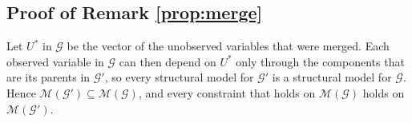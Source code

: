 \documentclass[12pt]{article}
\begin{document}
\subsection*{Proof of Remark \ref{prop:merge}}

Let $U^*$ in $\mathcal{G}$ be the vector of the unobserved variables that were merged. Each observed variable in $\mathcal{G}$ can then depend on $U^*$ only through the components that are its parents in $\mathcal{G}'$, so every structural model for $\mathcal{G}'$ is a structural model for $\mathcal{G}$. Hence $\mathcal{M}(\mathcal{G}') \subseteq \mathcal{M}(\mathcal{G})$, and every constraint that holds on $\mathcal{M}(\mathcal{G})$ holds on $\mathcal{M}(\mathcal{G}')$.





\end{document}
